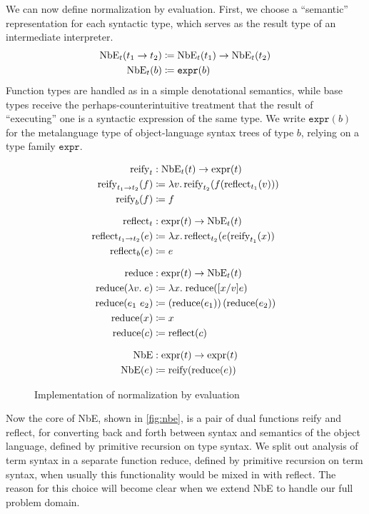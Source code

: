 We can now define normalization by evaluation.
First, we choose a ``semantic'' representation for each syntactic type, which serves as the result type of an intermediate interpreter.
\label{sec:NbE_t}
\begin{align*}
  \text{NbE}_t(t_1 \to t_2) & \coloneqq \text{NbE}_t(t_1) \to \text{NbE}_t(t_2) \\
  \text{NbE}_t(b) & \coloneqq \texttt{expr}(b)
\end{align*}
Function types are handled as in a simple denotational semantics, while base types receive the perhaps-counterintuitive treatment that the result of ``executing'' one is a syntactic expression of the same type.
We write $\texttt{expr}(b)$ for the metalanguage type of object-language syntax trees of type $b$, relying on a type family $\texttt{expr}$.

\begin{figure}%
\begin{align*}
  \text{reify}_t & : \text{NbE}_t(t) \to \text{expr}(t) \\
  \text{reify}_{t_1 \to t_2}(f) & \defeq \lambda v.\,\text{reify}_{t_2}(f(\text{reflect}_{t_1}(v))) \\
  \text{reify}_{b}(f) & \defeq f \\ \noalign{\vskip7pt}
  \text{reflect}_t & : \text{expr}(t) \to \text{NbE}_t(t) \\
  \text{reflect}_{t_1\to t_2}(e) & \defeq \lambda x.\,\text{reflect}_{t_2}(e(\text{reify}_{t_1}(x)) \\
  \text{reflect}_{b}(e) & \defeq e \\ \noalign{\vskip7pt}
  \text{reduce} & : \text{expr}(t) \to \text{NbE}_t(t) \\
  \text{reduce}(\lambda v. \; e) & \defeq \lambda x. \; \text{reduce}([x/v]e) \\
  \text{reduce}(e_1~e_2) & \defeq \left(\text{reduce}(e_1)\right)(\text{reduce}(e_2)) \\
  \text{reduce}(x) & \defeq x \\
  \text{reduce}(c) & \defeq \text{reflect}(c) \\ \noalign{\vskip7pt}
  \text{NbE} & : \text{expr}(t) \to \text{expr}(t) \\
  \text{NbE}(e) & \defeq \text{reify}(\text{reduce}(e))
\end{align*}
\caption{\label{fig:nbe}Implementation of normalization by evaluation}
\end{figure}

Now the core of NbE, shown in \autoref{fig:nbe}, is a pair of dual functions reify and reflect, for converting back and forth between syntax and semantics of the object language, defined by primitive recursion on type syntax.
We split out analysis of term syntax in a separate function reduce, defined by primitive recursion on term syntax, when usually this functionality would be mixed in with reflect.
The reason for this choice will become clear when we extend NbE to handle our full problem domain.

